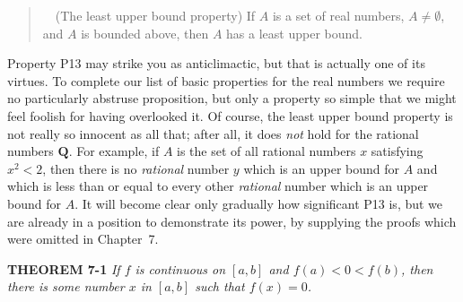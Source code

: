 \begin{quote}
\ \ (The least upper bound property) If $A$ is a set of real
numbers, $A \neq \emptyset$, and $A$ is bounded above, then $A$ has a least
upper bound.
\end{quote}

Property P13 may strike you as anticlimactic, but that is actually one of its
virtues. To complete our list of basic properties for the real numbers we
require no particularly abstruse proposition, but only a property so simple
that we might feel foolish for having overlooked it. Of course, the least
upper bound property is not really so innocent as all that; after all, it
does \emph{not} hold for the rational numbers $\mathbf{Q}$. For example, if
$A$ is the set of all rational numbers $x$ satisfying $x^2 < 2$, then there
is no \emph{rational} number $y$ which is an upper bound for $A$ and which is
less than or equal to every other \emph{rational} number which is an upper
bound for $A$. It will become clear only gradually how significant P13 is,
but we are already in a position to demonstrate its power, by supplying the
proofs which were omitted in Chapter~7.

\medskip
\noindent\textbf{THEOREM 7-1}\enspace
\textit{If $f$ is continuous on $[a,b]$ and $f(a) < 0 < f(b)$, then there is
some number $x$ in $[a,b]$ such that $f(x) = 0$.}

